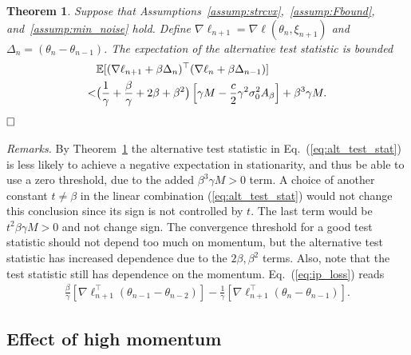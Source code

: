 \documentclass[conference]{IEEEtran}
\newcommand{\Ex}[1]{\mathbb{E}[ #1 ]}
\newtheorem{theorem}{Theorem}
\begin{document}
\begin{theorem}
\label{thm:ip_opt}
Suppose that Assumptions~\ref{assump:strcvx},~\ref{assump:Fbound}, and~\ref{assump:min_noise} hold.
Define $\nabla \ell_{n+1} = \nabla \ell (\theta_n, \xi_{n+1})$ and $\Delta_n = (\theta_n - \theta_{n-1})$.
The expectation of the alternative test statistic is bounded
\begin{align}\label{eq:alt_test_stat}
&\Ex{ ( \nabla \ell _{n+1} + \beta \Delta_n )^\top ( \nabla \ell_n + \beta \Delta_{n-1} ) } \\\notag
<& \big( \frac{1}{\gamma} + \frac{\beta}{\gamma} + 2 \beta + \beta^2 \big) \left[ \gamma M - \frac{c}{2} \gamma^2 \sigma_0^2 A_\beta \right]
+ \beta^3 \gamma M.
\end{align}$\hfill\Box$
\end{theorem}
\emph{Remarks.}
By Theorem~\ref{thm:ip_opt} the alternative test statistic in Eq.~(\ref{eq:alt_test_stat}) is less likely to achieve a negative expectation in stationarity, and thus be able to use a zero threshold, due to the added $\beta^3 \gamma M > 0$ term.
A choice of another constant $t \neq \beta$ in the linear combination (\ref{eq:alt_test_stat}) would not change this conclusion since its sign is not controlled by $t$.
The last term would be $t^2 \beta \gamma M > 0$ and not change sign.
The convergence threshold for a good test statistic should not depend too much on momentum, but the alternative test statistic has increased dependence due to the $2\beta, \beta^2$ terms. 
Also, note that the test statistic still has dependence on the momentum. 
Eq.~(\ref{eq:ip_loss}) reads
\begin{align}
\label{eq:ip_breakdown}
\frac{\beta}{\gamma} [ \nabla \ell_{n+1}^\top (\theta_{n-1} - \theta_{n-2} ) ]
- \frac{1}{\gamma} [ \nabla \ell_{n+1}^\top ( \theta_n - \theta_{n-1} )].
\end{align}


\subsection{Effect of high momentum}
\end{document}
